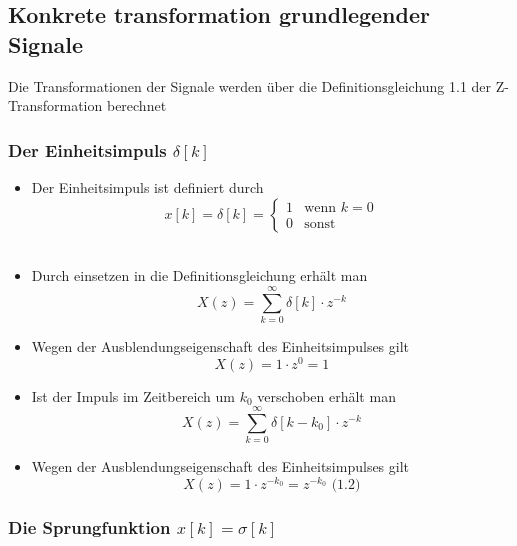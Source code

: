 \documentclass[11pt]{article}
\begin{document}
    \subsection{Konkrete transformation grundlegender
Signale}\label{konkrete-transformation-grundlegender-signale}

Die Transformationen der Signale werden über die Definitionsgleichung
1.1 der Z-Transformation berechnet

    \subsubsection{\texorpdfstring{Der Einheitsimpuls
\(\delta[k]\)}{Der Einheitsimpuls \textbackslash{}delta{[}k{]}}}\label{der-einheitsimpuls-deltak}

\begin{itemize}
\item
  Der Einheitsimpuls ist definiert durch\\
  \[
  \displaystyle x[k] = \delta[k] = \begin{cases}
   1 & \text{wenn $k = 0$} \\ 
   0 & \text{sonst} 
   \end{cases}
  \]\\
\item
  Durch einsetzen in die Definitionsgleichung erhält man
  \[X(z) = \sum_{k=0}^\infty \delta[k] \cdot z^{-k}\]
\item
  Wegen der Ausblendungseigenschaft des Einheitsimpulses gilt
  \[X(z) = 1 \cdot z^0 = 1\]
\item
  Ist der Impuls im Zeitbereich um \(k_0\) verschoben erhält man
  \[X(z) = \sum_{k=0}^\infty \delta[k-k_0] \cdot z^{-k}\]
\item
  Wegen der Ausblendungseigenschaft des Einheitsimpulses gilt
  \[X(z) = 1 \cdot z^{-k_0} = z^{-k_0}\textrm{  (1.2)}\]
\end{itemize}

    \subsubsection{\texorpdfstring{Die Sprungfunktion
\(x[k] = \sigma[k]\)}{Die Sprungfunktion x{[}k{]} = \textbackslash{}sigma{[}k{]}}}\label{die-sprungfunktion-xk-sigmak}
\end{document}
